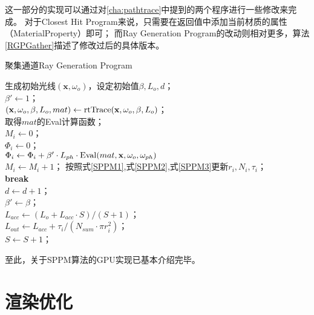这一部分的实现可以通过对\ref{cha:pathtrace}中提到的两个程序进行一些修改来完成。
对于Closest Hit Program来说，只需要在返回值中添加当前材质的属性（MaterialProperty）即可；
而Ray Generation Program的改动则相对更多，算法\ref{RGPGather}描述了修改过后的具体版本。

\begin{algorithm}
    \caption{聚集通道Ray Generation Program}
    \label{RGPGather}
    生成初始光线$(\textbf{x}, \omega_o)$，设定初始值$\beta,L_o,d$；\\
    $\beta' \leftarrow 1$；\\
    {
        $(\textbf{x}, \omega_o, \beta, L_o, mat) \leftarrow {\rm rtTrace}(\textbf{x}, \omega_o, \beta, L_o)$；\\
        {
            取得$mat$的Eval计算函数；\\
            $M_i \leftarrow 0$；\\
            $\Phi_i \leftarrow 0$；\\
            {
                $\Phi_i \leftarrow \Phi_i + \beta' \cdot L_{ph}\cdot {\rm Eval}(mat, \textbf{x}, \omega_o, \omega_{ph})$\\
                $M_i \leftarrow M_i+1$；
            }
            按照式\ref{SPPM1},式\ref{SPPM2},式\ref{SPPM3}更新$r_i, N_i,\tau_i$；\\
            \textbf{break}\\
        }
        $d \leftarrow d+1$； \\
        $\beta' \leftarrow \beta$；\\
    }
    $L_{acc} \leftarrow (L_o+L_{acc}\cdot S)/(S+1)$；\\
    $L_{out} \leftarrow L_{acc}+\tau_i/(N_{sum}\cdot \pi r_i^2)$；\\
    $S \leftarrow S+1$；
\end{algorithm}

至此，关于SPPM算法的GPU实现已基本介绍完毕。

\section{渲染优化}


